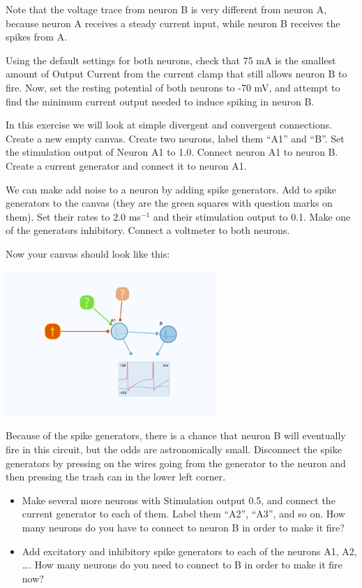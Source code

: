 \begin{Exercise}[title=Small Networks]
\begin{ExePart}
Note that the voltage trace from neuron B is very different from neuron A, because neuron A receives a steady current input, while neuron B receives the spikes from A. 

Using the default settings for both neurons, check that 75 mA is the smallest amount of Output Current from the current clamp that still allows neuron B to fire. Now, set the resting potential of both neurons to -70 mV, and attempt to find the minimum current output needed to induce spiking in neuron B.
\end{ExePart}

\begin{ExePart}
In this exercise we will look at simple divergent and convergent connections. Create a new empty canvas. Create two neurons, label them ``A1'' and ``B''. Set the stimulation output of Neuron A1 to 1.0. Connect neuron A1 to neuron B. Create a current generator and connect it to neuron A1. 

We can make add noise to a neuron by adding spike generators. Add to spike generators to the canvas (they are the green squares with question marks on them). Set their rates to 2.0 ms$^{-1}$ and their stimulation output to 0.1. Make one of the generators inhibitory. Connect a voltmeter to both neurons. 

Now your canvas should look like this: 
\begin{center}
\includegraphics[width=8cm]{two_neurons_noise.png}
\end{center}

Because of the spike generators, there is a chance that neuron B will eventually fire in this circuit, but the odds are astronomically small. Disconnect the spike generators by pressing on the wires going from the generator to the neuron and then pressing the trash can in the lower left corner. 
\begin{itemize}
\item Make several more neurons with Stimulation output 0.5, and connect the current generator to each of them. Label them ``A2'', ``A3'', and so on. How many neurons do you have to connect to neuron B in order to make it fire? 

\item Add excitatory and inhibitory spike generators to each of the neurons A1, A2, \dots. How many neurons do you need to connect to B in order to make it fire now?
\end{itemize}
\end{ExePart}



\end{Exercise}
